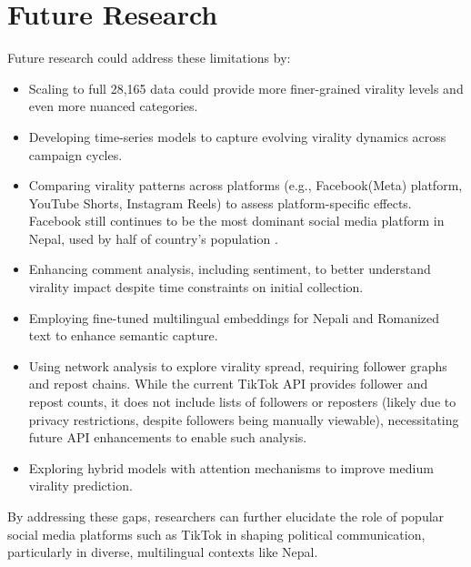 \documentclass[12pt,a4paper]{report}
\begin{document}
\section{Future Research}
    Future research could address these limitations by:
    \begin{itemize}
        \item Scaling to full 28,165 data could provide more finer-grained virality levels and even more nuanced categories.
        \item Developing time-series models to capture evolving virality dynamics across campaign cycles.
        \item Comparing virality patterns across platforms (e.g., Facebook(Meta) platform, YouTube Shorts, Instagram Reels) to assess platform-specific effects. Facebook still continues to be the most dominant social media platform in Nepal, used by half of country's population \parencite{napoleoncat2025}.
        \item Enhancing comment analysis, including sentiment, to better understand virality impact despite time constraints on initial collection.
        \item Employing fine-tuned multilingual embeddings for Nepali and Romanized text to enhance semantic capture.
        \item Using network analysis to explore virality spread, requiring follower graphs and repost chains. While the current TikTok API provides follower and repost counts, it does not include lists of followers or reposters (likely due to privacy restrictions, despite followers being manually viewable), necessitating future API enhancements to enable such analysis.
        \item Exploring hybrid models with attention mechanisms to improve medium virality prediction.
    \end{itemize}

    By addressing these gaps, researchers can further elucidate the role of popular  social media platforms such as TikTok in shaping political communication, particularly in diverse, multilingual contexts like Nepal.
\newpage
\end{document}
